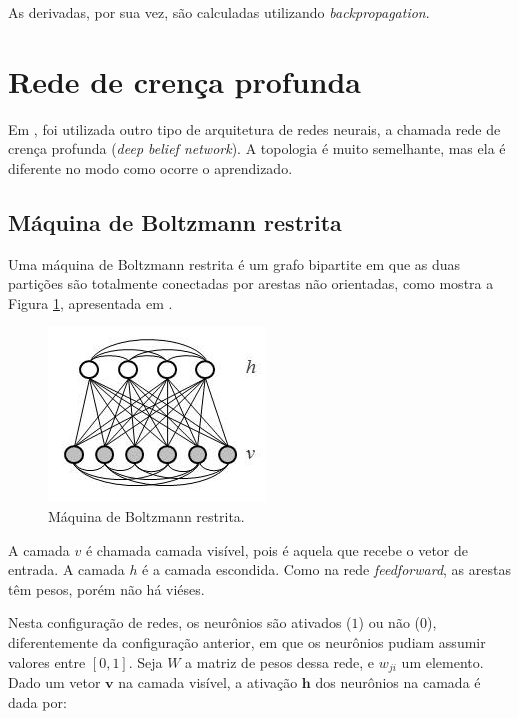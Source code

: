 \documentclass{article}
\begin{document}
            As derivadas, por sua vez, são calculadas utilizando \textit{backpropagation}.

    \section{Rede de crença profunda}
        \label{belief}

        Em \cite{testolin2018deep}, foi utilizada outro tipo de arquitetura de redes neurais, a chamada rede de crença profunda (\textit{deep belief network}).
        A topologia é muito semelhante, mas ela é diferente no modo como ocorre o aprendizado.

        \subsection{Máquina de Boltzmann restrita}

            Uma máquina de Boltzmann restrita é um grafo bipartite em que as duas partições são totalmente conectadas por arestas não orientadas, como mostra a Figura \ref{fig3}, apresentada em \cite{testolin2018deep}.

            \begin{figure}[h!]
                \centering
                \includegraphics[scale=0.5]{Images/Restricted Boltzmann machine.png}
                \caption{Máquina de Boltzmann restrita.}
                \label{fig3}
            \end{figure}

            A camada $v$ é chamada camada visível, pois é aquela que recebe o vetor de entrada.
            A camada $h$ é a camada escondida. Como na rede \textit{feedforward}, as arestas têm pesos, porém não há viéses.

            Nesta configuração de redes, os neurônios são ativados ($1$) ou não ($0$), diferentemente da configuração anterior, em que os neurônios pudiam assumir valores entre $[0, 1]$.
            Seja $W$ a matriz de pesos dessa rede, e $w_{ji}$ um elemento.
            Dado um vetor $\mathbf{v}$ na camada visível, a ativação $\mathbf{h}$ dos neurônios na camada é dada por:
\end{document}
